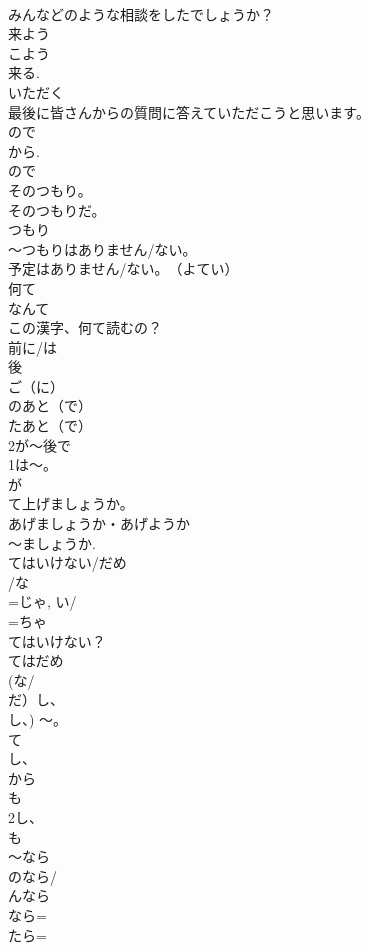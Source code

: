 \documentclass[8pt]{extreport}
\begin{document}
\begin{CJK}{UTF8}{min}
\\	みんなどのような相談をしたでしょうか？	
\\	来よう
\\	こよう
\\	来る.
\\	いただく 
\\	最後に皆さんからの質問に答えていただこうと思います。
\\	ので
\\	から.
\\	ので 
\\	そのつもり。
\\	そのつもりだ。
\\	つもり 
\\	～つもりはありません/ない。
\\	予定はありません/ない。　（よてい）	
\\	何て
\\	なんて 
\\	この漢字、何て読むの？	
\\	前に/は
\\	後
\\	ご（に）
\\	のあと（で）
\\	たあと（で）
\\	2が～後で
\\	1は～。
\\	が 
\\	て上げましょうか。
\\	あげましょうか・あげようか 
\\	～ましょうか.
\\	てはいけない/だめ
\\	/な
\\	=じゃ, い/
\\	=ちゃ
\\	てはいけない？
\\	てはだめ 
\\	(な/
\\	だ）し、
\\	し、) ～。
\\	て
\\	し、
\\	から
\\	も
\\	2し、
\\	も 
\\	～なら
\\	のなら/
\\	んなら
\\	なら= 
\\	たら= 

\end{CJK}
\end{document}
